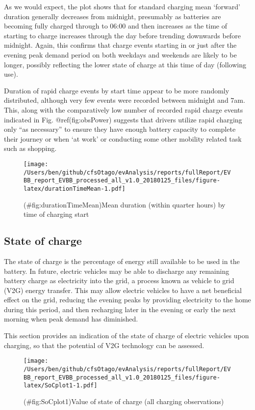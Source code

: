 \documentclass[]{article}
\begin{document}
As we would expect, the plot shows that for standard charging mean `forward' duration generally decreases from midnight, presumably as batteries are becoming fully charged through to 06:00 and then increases as the time of starting to charge increases through the day before trending downwards before midnight. Again, this confirms that charge events starting in or just after the evening peak demand period on both weekdays and weekends are likely to be longer, possibly reflecting the lower state of charge at this time of day (following use).

Duration of rapid charge events by start time appear to be more randomly distributed, although very few events were recorded between midnight and 7am. This, along with the comparatively low number of recorded rapid charge events indicated in Fig. @ref(fig:obsPower) suggests that drivers utilize rapid charging only ``as necessary'' to ensure they have enough battery capacity to complete their journey or when `at work' or conducting some other mobility related task such as shopping.

\begin{figure}
\centering
\texttt{[image: /Users/ben/github/cfsOtago/evAnalysis/reports/fullReport/EVBB\_report\_EVBB\_processed\_all\_v1.0\_20180125\_files/figure-latex/durationTimeMean-1.pdf]}
\caption{(\#fig:durationTimeMean)Mean duration (within quarter hours) by time of charging start}
\end{figure}

\hypertarget{SoC}{%
\subsection{State of charge}\label{SoC}}

The state of charge is the percentage of energy still available to be used in the battery. In future, electric vehicles may be able to discharge any remaining battery charge as electricity into the grid, a process known as vehicle to grid (V2G) energy transfer. This may allow electric vehicles to have a net beneficial effect on the grid, reducing the evening peaks by providing electricity to the home during this period, and then recharging later in the evening or early the next morning when peak demand has diminished.

This section provides an indication of the state of charge of electric vehicles upon charging, so that the potential of V2G technology can be assessed.

\begin{figure}
\centering
\texttt{[image: /Users/ben/github/cfsOtago/evAnalysis/reports/fullReport/EVBB\_report\_EVBB\_processed\_all\_v1.0\_20180125\_files/figure-latex/SoCplot1-1.pdf]}
\caption{(\#fig:SoCplot1)Value of state of charge (all charging observations)}
\end{figure}
\end{document}
